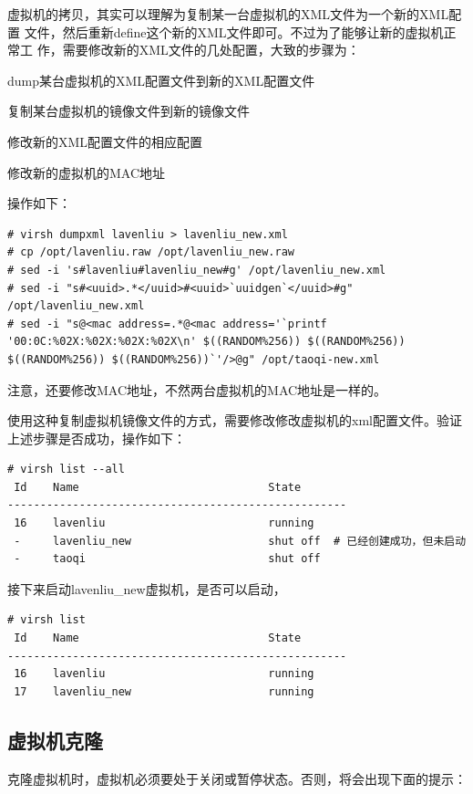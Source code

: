 虚拟机的拷贝，其实可以理解为复制某一台虚拟机的XML文件为一个新的XML配置
文件，然后重新define这个新的XML文件即可。不过为了能够让新的虚拟机正常工
作，需要修改新的XML文件的几处配置，大致的步骤为：

dump某台虚拟机的XML配置文件到新的XML配置文件

复制某台虚拟机的镜像文件到新的镜像文件

修改新的XML配置文件的相应配置

修改新的虚拟机的MAC地址

操作如下：

\begin{verbatim}
# virsh dumpxml lavenliu > lavenliu_new.xml
# cp /opt/lavenliu.raw /opt/lavenliu_new.raw
# sed -i 's#lavenliu#lavenliu_new#g' /opt/lavenliu_new.xml
# sed -i "s#<uuid>.*</uuid>#<uuid>`uuidgen`</uuid>#g" /opt/lavenliu_new.xml
# sed -i "s@<mac address=.*@<mac address='`printf '00:0C:%02X:%02X:%02X:%02X\n' $((RANDOM%256)) $((RANDOM%256)) $((RANDOM%256)) $((RANDOM%256))`'/>@g" /opt/taoqi-new.xml
\end{verbatim}

注意，还要修改MAC地址，不然两台虚拟机的MAC地址是一样的。

使用这种复制虚拟机镜像文件的方式，需要修改修改虚拟机的xml配置文件。验证上述步骤是否成功，操作如下：

\begin{verbatim}
# virsh list --all
 Id    Name                           	State
----------------------------------------------------
 16    lavenliu                       	running
 -     lavenliu_new                   	shut off  # 已经创建成功，但未启动
 -     taoqi                          	shut off
\end{verbatim}

接下来启动lavenliu\_new虚拟机，是否可以启动，

\begin{verbatim}
# virsh list 
 Id    Name                           	State
----------------------------------------------------
 16    lavenliu                       	running
 17    lavenliu_new                   	running
\end{verbatim}

\subsection{虚拟机克隆}
\label{sec:cloneVM}

克隆虚拟机时，虚拟机必须要处于关闭或暂停状态。否则，将会出现下面的提示：

